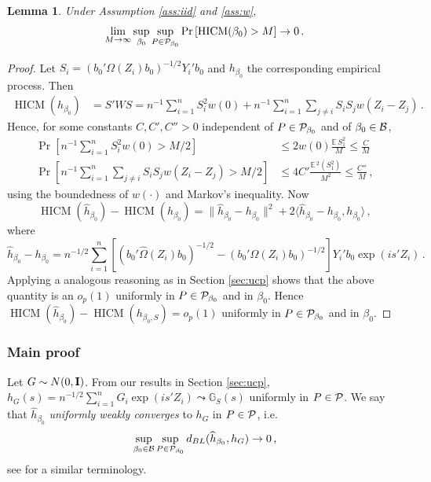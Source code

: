 \documentclass[12pt]{article}
\newcommand{\E}{\operatorname{E}}
\newcommand{\1}{\mathbf{1}}
\newcommand{\HICM}{\operatorname{HICM}}
\def\E{\mathbb{E}\,}
\newcommand{\mI}{\mbox{\bf I}}
\newcommand{\ip}[2]{\langle #1,#2 \rangle}
\newcounter{thm}[section]
\newtheorem{lem}[thm]{Lemma}
\begin{document}
\begin{lem} Under Assumption \ref{ass:iid} and \ref{ass:w},
\[
\lim_{M \rightarrow \infty}\sup_{\beta_{0}} \sup_{P \in {\cal P}_{\beta_{0}}}
\Pr \left[ \HICM (\beta_{0}) > M \right] \rightarrow 0
\, .
\]
\label{lem:boundicm}
\end{lem}
\begin{proof}
Let $S_i = \left( b_0' {\Omega}(Z_i) b_0 \right)^{-1/2} Y_i'b_0$ and
$h_{\beta_0}$ the corresponding empirical process. Then
\begin{align*}
\HICM (h_{\beta_{0}})
&=  S'WS = n^{-1} \sum_{i=1}^{n}{S_{i}^{2} w(0)}
+ n^{-1} \sum_{i=1}^{n}{ \sum_{j\neq i}^{}{}S_{i}S_{j} w(Z_{i}-Z_{j})}
\, .
\end{align*}
Hence, for some constants $C, C' , C''>0$ independent of $P \in {\cal
P}_{\beta_{0}}$ and of $\beta_{0} \in {\cal B}$,
\begin{align*}
\Pr \left[ n^{-1} \sum_{i=1}^{n}{S_{i}^{2} w(0)} > M/2 \right] & \leq
2  w(0) \frac{\E S_{1}^{2}}{M} \leq \frac{C}{M}
\\
\Pr \left[ n^{-1} \sum_{i=1}^{n}{ \sum_{j\neq i}^{}{}S_{i}S_{j}
w(Z_{i}-Z_{j})}  > M/2 \right] & \leq
4 C' \frac{\E^{2} (S_{1}^{2}) }{M^{2}} \leq \frac{C''}{M}
\, ,
\end{align*}
using the boundedness of  $w(\cdot)$ and  Markov's inequality.
Now
\[
\HICM (\widehat{h}_{\beta_0}) -  \HICM (h_{\beta_{0}})
= \| \widehat{h}_{\beta_0} - h_{\beta_{0}}\|^2  + 2
\ip{\widehat{h}_{\beta_0} - h_{\beta_{0}}}{h_{\beta_{0}}}
\, ,
\]
where
\[
\widehat{h}_{\beta_0} - h_{\beta_{0}}  =
n^{-1/2} \sum_{i=1}^{n}{
\left[
\left(b_0' \widehat{\Omega}(Z_i) b_0\right)^{-1/2}
- \left(b_0' {\Omega}(Z_i) b_0\right)^{-1/2}
\right]
Y_{i}'b_0  \exp(i s'Z_{i})}
\, .
\]
Applying a analogous reasoning as in Section \ref{sec:ucp} shows that
the above quantity
is an $o_p(1)$ uniformly in $P \in {\cal P}_{\beta_{0}}$ and in $\beta_{0}$.
Hence
$
\HICM (\widehat{h}_{\beta_0}) -  \HICM (h_{\beta_{0}, {S}}) = o_p(1)
$
uniformly in $P \in {\cal P}_{\beta_{0}}$ and in $\beta_{0}$.
\end{proof}

\subsubsection{Main proof}

Let $G  \sim N (0, \mI)$. From our results in Section \ref{sec:ucp},
$
h_{{G}} (s) = n^{-1/2} \sum_{i=1}^{n}{ {G}_{i}  \exp(i
s'Z_{i})}  \leadsto \mathbb{G}_{S}(s)
$
uniformly in $P \in {\cal P}$. We say that $\widehat{h}_{\beta_0}$ {\em
uniformly weakly converges} to $h_{{G}}$  in $P \in
{\cal P}$, i.e.
\[
\sup_{\beta_{0} \in {\cal B}}
\sup_{P \in {\cal P}_{\beta_0}} d_{BL}(\widehat{h}_{\beta_{0}}, h_{{G}})
\rightarrow 0
\, ,
\]
see \cite{kasy_uniformity_2019} for a similar  terminology.
\end{document}
